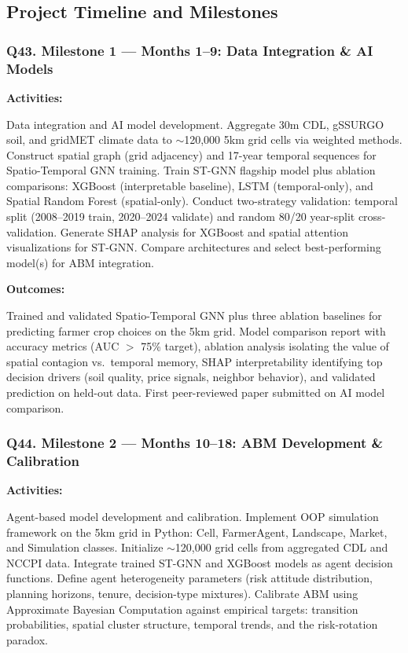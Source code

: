\documentclass[11pt,letterpaper]{article}
\newcommand{\answer}[1]{%
    \vspace{0.2em}%
    \noindent\colorbox{answerbox}{\parbox{\dimexpr\textwidth-2\fboxsep}{%
        \vspace{0.4em}#1\vspace{0.4em}%
    }}%
    \vspace{0.5em}%
}
\begin{document}
\subsection{Project Timeline and Milestones}

\subsubsection{Q43. Milestone 1 --- Months 1--9: Data Integration \& AI Models}

\textbf{Activities:}
\answer{Data integration and AI model development. Aggregate 30m CDL, gSSURGO soil, and gridMET climate data to ${\sim}$120,000 5km grid cells via weighted methods. Construct spatial graph (grid adjacency) and 17-year temporal sequences for Spatio-Temporal GNN training. Train ST-GNN flagship model plus ablation comparisons: XGBoost (interpretable baseline), LSTM (temporal-only), and Spatial Random Forest (spatial-only). Conduct two-strategy validation: temporal split (2008--2019 train, 2020--2024 validate) and random 80/20 year-split cross-validation. Generate SHAP analysis for XGBoost and spatial attention visualizations for ST-GNN. Compare architectures and select best-performing model(s) for ABM integration.}

\textbf{Outcomes:}
\answer{Trained and validated Spatio-Temporal GNN plus three ablation baselines for predicting farmer crop choices on the 5km grid. Model comparison report with accuracy metrics (AUC {$>$} 75\% target), ablation analysis isolating the value of spatial contagion vs.\ temporal memory, SHAP interpretability identifying top decision drivers (soil quality, price signals, neighbor behavior), and validated prediction on held-out data. First peer-reviewed paper submitted on AI model comparison.}

\subsubsection{Q44. Milestone 2 --- Months 10--18: ABM Development \& Calibration}

\textbf{Activities:}
\answer{Agent-based model development and calibration. Implement OOP simulation framework on the 5km grid in Python: Cell, FarmerAgent, Landscape, Market, and Simulation classes. Initialize ${\sim}$120,000 grid cells from aggregated CDL and NCCPI data. Integrate trained ST-GNN and XGBoost models as agent decision functions. Define agent heterogeneity parameters (risk attitude distribution, planning horizons, tenure, decision-type mixtures). Calibrate ABM using Approximate Bayesian Computation against empirical targets: transition probabilities, spatial cluster structure, temporal trends, and the risk-rotation paradox.}
\end{document}
